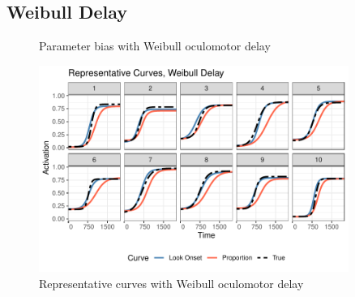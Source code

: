 \documentclass{article}
\begin{document}
\subsection{Weibull Delay}


\begin{figure}[H]
\centering

\caption{Parameter bias with Weibull oculomotor delay}
\label{fig:par_bias_weibull_delay}
\end{figure}

\begin{figure}[H]
\centering
\includegraphics[width=0.9\textwidth]{rep_curves_weibull_delay.pdf}
\caption{Representative curves with Weibull oculomotor delay}
\label{fig:rep_curves_weibull_delay}
\end{figure}
\end{document}
